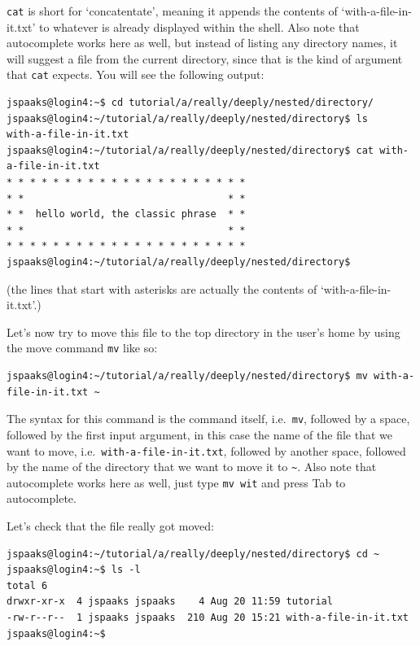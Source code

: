 \lstinline[style=bashinline]{cat} is short for `concatentate', meaning it appends the contents of `with-a-file-in-it.txt' to whatever is already displayed within the shell. Also note that autocomplete works here as well, but instead of listing any directory names, it will suggest a file from the current directory, since that is the kind of argument that \lstinline[style=bashinline]{cat} expects. You will see the following output:
\begin{lstlisting}[style=basic,style=bash]
jspaaks@login4:~$ cd tutorial/a/really/deeply/nested/directory/
jspaaks@login4:~/tutorial/a/really/deeply/nested/directory$ ls
with-a-file-in-it.txt
jspaaks@login4:~/tutorial/a/really/deeply/nested/directory$ cat with-a-file-in-it.txt 
* * * * * * * * * * * * * * * * * * * * *
* *                                   * *
* *  hello world, the classic phrase  * *
* *                                   * *
* * * * * * * * * * * * * * * * * * * * *
jspaaks@login4:~/tutorial/a/really/deeply/nested/directory$ 
\end{lstlisting}
(the lines that start with asterisks are actually the contents of `with-a-file-in-it.txt'.)

Let's now try to move this file to the top directory in the user's home by using the move command \lstinline[style=bashinline]{mv} like so:
\begin{lstlisting}[style=basic,style=bash]
jspaaks@login4:~/tutorial/a/really/deeply/nested/directory$ mv with-a-file-in-it.txt ~
\end{lstlisting}
The syntax for this command is the command itself, i.e.~\lstinline[style=bashinline]{mv}, followed by a space, followed by the first input argument, in this case the name of the file that we want to move, i.e.~\lstinline[style=bashinline]{with-a-file-in-it.txt}, followed by another space, followed by the name of the directory that we want to move it to \lstinline[style=bashinline]{~}. Also note that autocomplete works here as well, just type \lstinline[style=bashinline]{mv wit} and press Tab to autocomplete.

Let's check that the file really got moved:
\begin{lstlisting}[style=basic,style=bash]
jspaaks@login4:~/tutorial/a/really/deeply/nested/directory$ cd ~
jspaaks@login4:~$ ls -l
total 6
drwxr-xr-x  4 jspaaks jspaaks    4 Aug 20 11:59 tutorial
-rw-r--r--  1 jspaaks jspaaks  210 Aug 20 15:21 with-a-file-in-it.txt
jspaaks@login4:~$  
\end{lstlisting}

